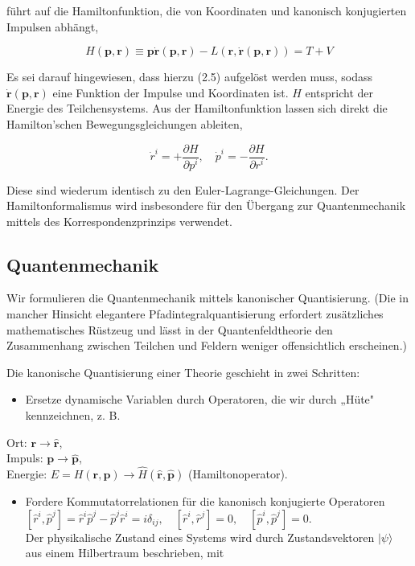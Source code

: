 \documentclass[10pt, letterpaper]{article}
\begin{document}
führt auf die Hamiltonfunktion, die von Koordinaten und kanonisch konjugierten Impulsen abhängt,

$$
H(\mathbf{p}, \mathbf{r}) \equiv \mathbf{p} \dot{\mathbf{r}}(\mathbf{p}, \mathbf{r})-L(\mathbf{r}, \dot{\mathbf{r}}(\mathbf{p}, \mathbf{r}))=T+V
$$

Es sei darauf hingewiesen, dass hierzu (2.5) aufgelöst werden muss, sodass $\dot{\mathbf{r}}(\mathbf{p}, \mathbf{r})$ eine Funktion der Impulse und Koordinaten ist. $H$ entspricht der Energie des Teilchensystems. Aus der Hamiltonfunktion lassen sich direkt die Hamilton'schen Bewegungsgleichungen ableiten,

$$
\dot{r}^{i}=+\frac{\partial H}{\partial p^{i}}, \quad \dot{p}^{i}=-\frac{\partial H}{\partial r^{i}} .
$$

Diese sind wiederum identisch zu den Euler-Lagrange-Gleichungen. Der Hamiltonformalismus wird insbesondere für den Übergang zur Quantenmechanik mittels des Korrespondenzprinzips verwendet.

\subsection{Quantenmechanik}
Wir formulieren die Quantenmechanik mittels kanonischer Quantisierung. (Die in mancher Hinsicht elegantere Pfadintegralquantisierung erfordert zusätzliches mathematisches Rüstzeug und lässt in der Quantenfeldtheorie den Zusammenhang zwischen Teilchen und Feldern weniger offensichtlich erscheinen.)

Die kanonische Quantisierung einer Theorie geschieht in zwei Schritten:

\begin{itemize}
  \item Ersetze dynamische Variablen durch Operatoren, die wir durch „Hüte" kennzeichnen, z. B.
\end{itemize}

Ort: $\mathbf{r} \rightarrow \hat{\mathbf{r}}$,\\
Impuls: $\mathbf{p} \rightarrow \hat{\mathbf{p}}$,\\
Energie: $E=H(\mathbf{r}, \mathbf{p}) \rightarrow \hat{H}(\hat{\mathbf{r}}, \hat{\mathbf{p}})$ (Hamiltonoperator).

\begin{itemize}
  \item Fordere Kommutatorrelationen für die kanonisch konjugierte Operatoren\\
$\left[\hat{r}^{i}, \hat{p}^{j}\right]=\hat{r}^{i} \hat{p}^{j}-\hat{p}^{j} \hat{r}^{i}=i \delta_{i j}, \quad\left[\hat{r}^{i}, \hat{r}^{j}\right]=0, \quad\left[\hat{p}^{i}, \hat{p}^{j}\right]=0$.\\
Der physikalische Zustand eines Systems wird durch Zustandsvektoren $|\psi\rangle$ aus einem Hilbertraum beschrieben, mit
\end{itemize}
\end{document}
